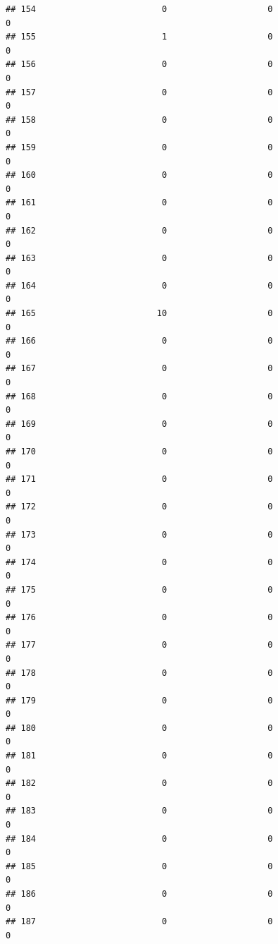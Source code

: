 \documentclass[
]{article}
\begin{document}
\begin{verbatim}
## 154                         0                    0                      0
## 155                         1                    0                      0
## 156                         0                    0                      0
## 157                         0                    0                      0
## 158                         0                    0                      0
## 159                         0                    0                      0
## 160                         0                    0                      0
## 161                         0                    0                      0
## 162                         0                    0                      0
## 163                         0                    0                      0
## 164                         0                    0                      0
## 165                        10                    0                      0
## 166                         0                    0                      0
## 167                         0                    0                      0
## 168                         0                    0                      0
## 169                         0                    0                      0
## 170                         0                    0                      0
## 171                         0                    0                      0
## 172                         0                    0                      0
## 173                         0                    0                      0
## 174                         0                    0                      0
## 175                         0                    0                      0
## 176                         0                    0                      0
## 177                         0                    0                      0
## 178                         0                    0                      0
## 179                         0                    0                      0
## 180                         0                    0                      0
## 181                         0                    0                      0
## 182                         0                    0                      0
## 183                         0                    0                      0
## 184                         0                    0                      0
## 185                         0                    0                      0
## 186                         0                    0                      0
## 187                         0                    0                      0

\end{verbatim}
\end{document}
